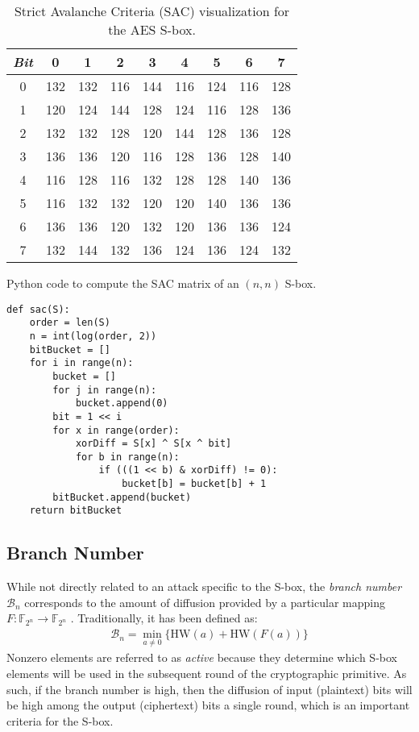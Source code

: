 \begin{table}
\begin{center}
\caption{Strict Avalanche Criteria (SAC) visualization for the AES S-box.}
\label{tab:aesSAC}
    \begin{tabular}{|c|c|c|c|c|c|c|c|c|} \hline
    \emph{Bit} & 0 & 1 & 2 & 3 & 4 & 5 & 6 & 7 \\ \hline
    0 & 132 & 132 & 116 & 144 & 116 & 124 & 116 & 128\\ 
	1 & 120 & 124 & 144 & 128 & 124 & 116 & 128 & 136\\ 
	2 & 132 & 132 & 128 & 120 & 144 & 128 & 136 & 128\\ 
	3 & 136 & 136 & 120 & 116 & 128 & 136 & 128 & 140\\ 
	4 & 116 & 128 & 116 & 132 & 128 & 128 & 140 & 136\\ 
	5 & 116 & 132 & 132 & 120 & 120 & 140 & 136 & 136\\ 
	6 & 136 & 136 & 120 & 132 & 120 & 136 & 136 & 124\\ 
	7 & 132 & 144 & 132 & 136 & 124 & 136 & 124 & 132\\ \hline
    \end{tabular}
\end{center}
\end{table}

\begin{listing}[ht!]
\caption{Python code to compute the SAC matrix of an $(n, n)$ S-box.}
\begin{verbatim}
def sac(S):
	order = len(S)
	n = int(log(order, 2))
	bitBucket = []
	for i in range(n):
		bucket = []
		for j in range(n):
			bucket.append(0)
		bit = 1 << i 
		for x in range(order):
			xorDiff = S[x] ^ S[x ^ bit]
			for b in range(n):
				if (((1 << b) & xorDiff) != 0):
					bucket[b] = bucket[b] + 1	
		bitBucket.append(bucket)
	return bitBucket
\end{verbatim}
\label{lst:SAC}
\end{listing}

\subsection{Branch Number}
While not directly related to an attack specific to the S-box, the \emph{branch number} $\mathcal{B}_n$ corresponds to the amount of diffusion provided by a particular mapping $F : \mathbb{F}_{2^n} \to \mathbb{F}_{2^n}$ \cite{daemen01-AES}. Traditionally, it has been defined as:
\begin{align*}
\mathcal{B}_n = \min_{a \not= 0}\{\text{HW}(a) + \text{HW}(F(a)) \}
\end{align*}
Nonzero elements are referred to as \emph{active} because they determine which S-box elements will be used in the subsequent round of the cryptographic primitive. As such, if the branch number is high, then the diffusion of input (plaintext) bits will be high among the output (ciphertext) bits a single round, which is an important criteria for the S-box. 

